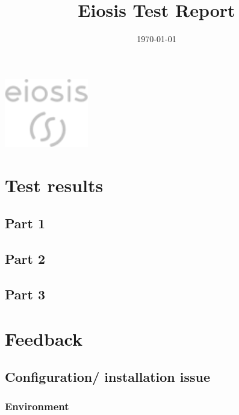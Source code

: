 \documentclass[10pt, a4paper]{article}
\title{Eiosis Test Report}
\date{\today}
\author{\arno}
\begin{document}
\maketitle
\bigskip

\vfill
\begin{center}
	\includegraphics[height=3cm]{images/eiosis-logo.png}
\end{center}


\newpage
\tableofcontents




\newpage

\newpage
\section{Test results}

\subsection{Part 1}



\newpage
\subsection{Part 2}

\newpage
\subsection{Part 3}


\newpage
\section{Feedback}

\subsection{Configuration/ installation issue}

\subsubsection*{Environment}
\end{document}
